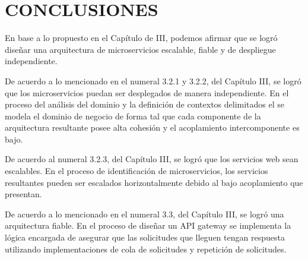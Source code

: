 \section{CONCLUSIONES}

En base a lo propuesto en el Capítulo de III, podemos afirmar que se logró
diseñar una arquitectura de microservicios escalable, fiable y de despliegue independiente.

De acuerdo a lo mencionado en el numeral 3.2.1 y 3.2.2, del Capítulo III, se logró que los
microservicios puedan ser desplegados de manera independiente.
En el proceso del análisis del dominio y la definición de contextos delimitados
el se modela el dominio de negocio de forma tal que cada componente de la arquitectura resultante
posee alta cohesión y el acoplamiento intercomponente es bajo.

De acuerdo al numeral 3.2.3, del Capítulo III, se logró que los
servicios web sean escalables.
En el proceso de identificación de microservicios, los servicios resultantes
pueden ser escalados horizontalmente debido al bajo acoplamiento que presentan.

De acuerdo a lo mencionado en el numeral 3.3, del Capítulo III, se logró una arquitectura
fiable.
En el proceso de diseñar un API gateway se implementa la lógica encargada de asegurar que
las solicitudes que lleguen tengan respuesta utilizando implementaciones de cola de solicitudes
y repetición de solicitudes.
